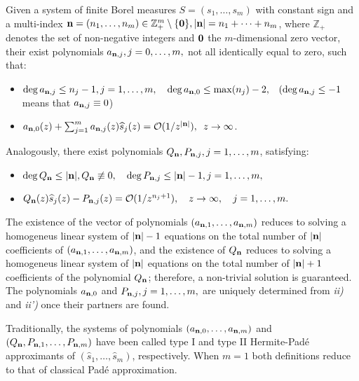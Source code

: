\documentclass[10pt,a4paper]{article}
\theoremstyle{definition}
\theoremstyle{remark}
\numberwithin{equation}{section}
\begin{document}
Given a system of finite Borel measures $S = (s_1,\ldots,s_m)$ with constant sign and a multi-index ${\bf n} = (n_1,\ldots,n_m) \in \mathbb{Z}_+^m \setminus \{{\bf 0}\}, |{\bf n}|= n_1+\cdots+n_m$, where $\mathbb{Z}_+$ denotes the set of non-negative integers and $\bf 0$ the $m$-dimensional zero vector, their exist polynomials $a_{{\bf n},j}, j=0,\ldots,m,$ not all identically equal to zero, such that:
\begin{itemize}
\item[\textit{i)}] $\deg a_{{\bf n},j} \leq n_j -1, j=1,\ldots,m, \quad \deg a_{{\bf n},0} \leq \max(n_j) -2,$ $\,\,\,(\deg a_{{\bf n},j} \leq -1$ means that $a_{{\bf n},j} \equiv 0$)
\item[\textit{ii)}] $a_{{\bf n},0}(z) + \sum_{j=1}^m a_{{\bf n},j}(z) \widehat{s}_j(z) = \mathcal{O}(1/z^{|{\bf n}|}),\,\,\, z \to \infty$.
\end{itemize}
Analogously, there exist polynomials $Q_{\bf n}, P_{{\bf n},j}, j=1,\ldots,m$, satisfying:
\begin{itemize}
\item[\textit{i')}] $\deg Q_{\bf n} \leq |{\bf n}|, Q_{\bf n} \not\equiv 0, \quad \deg P_{{\bf n},j} \leq |{\bf n}|-1, j=1,\ldots,m,$
\item[\textit{ii')}] $Q_{\bf n}(z) \widehat{s}_j (z) - P_{{\bf n},j}(z) = \mathcal{O}(1/z^{n_j +1}), \quad z\to \infty, \quad j=1,\ldots,m.$
\end{itemize}
The existence of the vector of polynomials $(a_{{\bf n},1}, \ldots, a_{{\bf n},m})$ reduces to solving a homogeneus linear system of $|{\bf n}|-1$ equations on the total number of $|{\bf n}|$ coefficients  of $(a_{{\bf n},1}, \ldots, a_{{\bf n},m})$, and the existence of $Q_{\bf n}$ reduces to solving a homogeneus linear system of $|{\bf n}|$ equations on the total number of $|{\bf n}|+1$ coefficients of the  polynomial $Q_{\bf n}$; therefore, a non-trivial solution is guaranteed.
The polynomials $a_{{\bf n},0}$ and $P_{{\bf n},j},j=1,\ldots,m,$ are uniquely determined from \textit{ii)} and \textit{ii')} once their partners are found.\par
Traditionally, the systems of polynomials $(a_{{\bf n},0}, \ldots,a_{{\bf n},m})$ and $(Q_{\bf n},P_{{\bf n},1},\ldots,P_{{\bf n},m})$ have been called type I and type II Hermite-Pad\'e approximants of $(\widehat{s}_1,\ldots,\widehat{s}_m)$, respectively. When $m=1$ both definitions reduce to that of classical Pad\'e approximation.\par
\end{document}
